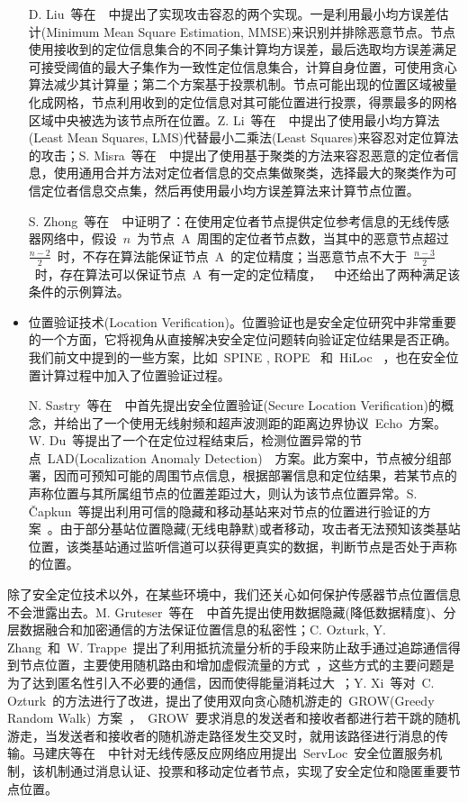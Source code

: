 \documentclass[a4paper,10pt]{article}
\begin{document}
\begin{itemize}
D. Liu~等在~\cite{Liu2005b, Liu2008a}~中提出了实现攻击容忍的两个实现。一是利用最小均方误差估计(Minimum Mean Square Estimation, MMSE)来识别并排除恶意节点。节点使用接收到的定位信息集合的不同子集计算均方误差，最后选取均方误差满足可接受阈值的最大子集作为一致性定位信息集合，计算自身位置，可使用贪心算法减少其计算量；第二个方案基于投票机制。节点可能出现的位置区域被量化成网格，节点利用收到的定位信息对其可能位置进行投票，得票最多的网格区域中央被选为该节点所在位置。Z. Li~等在~\cite{Li2005a}~中提出了使用最小均方算法(Least Mean Squares, LMS)代替最小二乘法(Least Squares)来容忍对定位算法的攻击；S. Misra~等在~\cite{Misra2007}~中提出了使用基于聚类的方法来容忍恶意的定位者信息，使用通用合并方法对定位者信息的交点集做聚类，选择最大的聚类作为可信定位者信息交点集，然后再使用最小均方误差算法来计算节点位置。

S. Zhong~等在~\cite{Zhong2008}~中证明了：在使用定位者节点提供定位参考信息的无线传感器网络中，假设~$n$~为节点~A~周围的定位者节点数，当其中的恶意节点超过~$\frac{n-2}{2}$~时，不存在算法能保证节点~A~的定位精度；当恶意节点不大于~$\frac{n-3}{2}$~时，存在算法可以保证节点~A~有一定的定位精度，~\cite{Zhong2008}~中还给出了两种满足该条件的示例算法。

\item 位置验证技术(Location Verification)。位置验证也是安全定位研究中非常重要的一个方面，它将视角从直接解决安全定位问题转向验证定位结果是否正确。我们前文中提到的一些方案，比如~SPINE \cite{Lazos2005a}, ROPE \cite{Lazos2006}~和~HiLoc \cite{Lazos2005a}~，也在安全位置计算过程中加入了位置验证过程。

N. Sastry~等在~\cite{Sastry2003}~中首先提出安全位置验证(Secure Location Verification)的概念，并给出了一个使用无线射频和超声波测距的距离边界协议~Echo~方案。W. Du~等提出了一个在定位过程结束后，检测位置异常的节点~LAD(Localization Anomaly Detection)~\cite{Du2006}~方案。此方案中，节点被分组部署，因而可预知可能的周围节点信息，根据部署信息和定位结果，若某节点的声称位置与其所属组节点的位置差距过大，则认为该节点位置异常。S. \v{C}apkun~等提出利用可信的隐藏和移动基站来对节点的位置进行验证的方案~\cite{Capkun2006a, Capkun2008}。由于部分基站位置隐藏(无线电静默)或者移动，攻击者无法预知该类基站位置，该类基站通过监听信道可以获得更真实的数据，判断节点是否处于声称的位置。

\end{itemize}

除了安全定位技术以外，在某些环境中，我们还关心如何保护传感器节点位置信息不会泄露出去。M. Gruteser~等在~\cite{Gruteser2003}~中首先提出使用数据隐藏(降低数据精度)、分层数据融合和加密通信的方法保证位置信息的私密性；C. Ozturk, Y. Zhang~和~W. Trappe~提出了利用抵抗流量分析的手段来防止敌手通过追踪通信得到节点位置，主要使用随机路由和增加虚假流量的方式~\cite{Ozturk2004}，这些方式的主要问题是为了达到匿名性引入不必要的通信，因而使得能量消耗过大~\cite{Xiao2006}；Y. Xi~等对~C. Ozturk~的方法进行了改进，提出了使用双向贪心随机游走的~GROW(Greedy Random Walk)~方案~\cite{Xi2006}，~GROW~要求消息的发送者和接收者都进行若干跳的随机游走，当发送者和接收者的随机游走路径发生交叉时，就用该路径进行消息的传输。马建庆等在~\cite{Ma2008}~中针对无线传感反应网络应用提出~ServLoc~安全位置服务机制，该机制通过消息认证、投票和移动定位者节点，实现了安全定位和隐匿重要节点位置。
\end{document}
